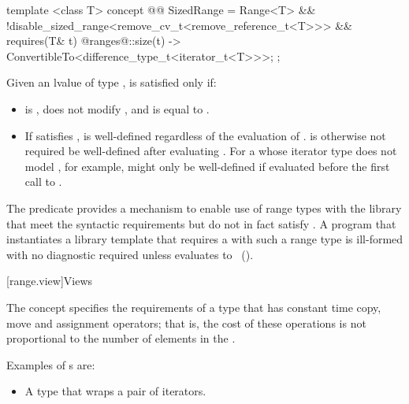 {\begin{itemdecl}
template <class T>
concept @@ SizedRange =
  Range<T> &&
  !disable_sized_range<remove_cv_t<remove_reference_t<T>>> &&
  requires(T& t) {
    { @ranges@::size(t) } -> ConvertibleTo<difference_type_t<iterator_t<T>>>;
  };
\end{itemdecl}

\begin{itemdescr}
\pnum
Given an lvalue  of type ,  is satisfied only if:

\begin{itemize}
\item {} is , does not modify , and is equal
to .

\item If  satisfies ,
 is well-defined regardless of the evaluation of
. \enternote {} is otherwise not required be
well-defined after evaluating . For a 
whose iterator type does not model , for
example,  might only be well-defined if evaluated before
the first call to . \exitnote
\end{itemize}

\pnum
\enternote The  predicate provides a mechanism to enable use
of range types with the library that meet the syntactic requirements but do
not in fact satisfy . A program that instantiates a library template
that requires a  with such a range type  is ill-formed with no
diagnostic required unless
 evaluates
to ~(). \exitnote
\end{itemdescr}

[range.view]{Views}

\pnum
The  concept specifies the requirements of a
 type that has constant time copy, move and assignment operators; that
is, the cost of these operations is not proportional to the number of elements in
the .

\pnum
\enterexample
Examples of s are:

\begin{itemize}
\item A  type that wraps a pair of iterators.


\end{itemize}}
